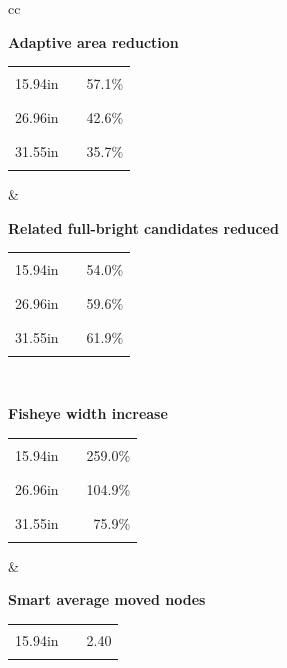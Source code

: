 \begin{center}
\begin{figure}[htbp]
\centering
\begin{tabular}{cc}
\begin{minipage}[t]{0.46\textwidth}
\centering
\textbf{Adaptive area reduction}\\[-0.2em]
\begin{tabular}{@{}r l r@{}}
15.94in & \textcolor{blue!70!black}{\rule{0.2000\textwidth}{1.1ex}} & 57.1\% \\
26.96in & \textcolor{blue!70!black}{\rule{0.1491\textwidth}{1.1ex}} & 42.6\% \\
31.55in & \textcolor{blue!70!black}{\rule{0.1249\textwidth}{1.1ex}} & 35.7\% \\
\end{tabular}
\end{minipage}
&
\begin{minipage}[t]{0.46\textwidth}
\centering
\textbf{Related full-bright candidates reduced}\\[-0.2em]
\begin{tabular}{@{}r l r@{}}
15.94in & \textcolor{blue!70!black}{\rule{0.1745\textwidth}{1.1ex}} & 54.0\% \\
26.96in & \textcolor{blue!70!black}{\rule{0.1926\textwidth}{1.1ex}} & 59.6\% \\
31.55in & \textcolor{blue!70!black}{\rule{0.2000\textwidth}{1.1ex}} & 61.9\% \\
\end{tabular}
\end{minipage} \\[1.2em]
\begin{minipage}[t]{0.46\textwidth}
\centering
\textbf{Fisheye width increase}\\[-0.2em]
\begin{tabular}{@{}r l r@{}}
15.94in & \textcolor{blue!70!black}{\rule{0.2000\textwidth}{1.1ex}} & 259.0\% \\
26.96in & \textcolor{blue!70!black}{\rule{0.0810\textwidth}{1.1ex}} & 104.9\% \\
31.55in & \textcolor{blue!70!black}{\rule{0.0586\textwidth}{1.1ex}} & 75.9\% \\
\end{tabular}
\end{minipage}
&
\begin{minipage}[t]{0.46\textwidth}
\centering
\textbf{Smart average moved nodes}\\[-0.2em]
\begin{tabular}{@{}r l r@{}}
15.94in & \textcolor{blue!70!black}{\rule{0.2000\textwidth}{1.1ex}} & 2.40 \\

\end{tabular}
\end{minipage}
\end{tabular}
\end{figure}
\end{center}
